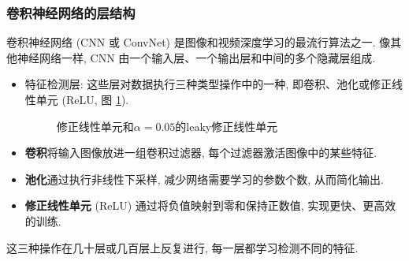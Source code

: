 \subsubsection{卷积神经网络的层结构}
卷积神经网络 (CNN 或 ConvNet) 是图像和视频深度学习的最流行算法之一.
像其他神经网络一样, CNN 由一个输入层、一个输出层和中间的多个隐藏层组成.
\begin{itemize}
\item 特征检测层: 这些层对数据执行三种类型操作中的一种, 即卷积、池化或修正线性单元 (ReLU, 图 \ref{ReLU20200203001}).
\begin{figure}[H]
\begin{center}
\end{center}
\caption{修正线性单元和$\alpha=0.05$的leaky修正线性单元}
\label{ReLU20200203001}
\end{figure}

\item \textbf{卷积}将输入图像放进一组卷积过滤器, 每个过滤器激活图像中的某些特征.
\item \textbf{池化}通过执行非线性下采样, 减少网络需要学习的参数个数, 从而简化输出.
\item \textbf{修正线性单元} (ReLU) 通过将负值映射到零和保持正数值, 实现更快、更高效的训练.
\end{itemize}

这三种操作在几十层或几百层上反复进行, 每一层都学习检测不同的特征.
